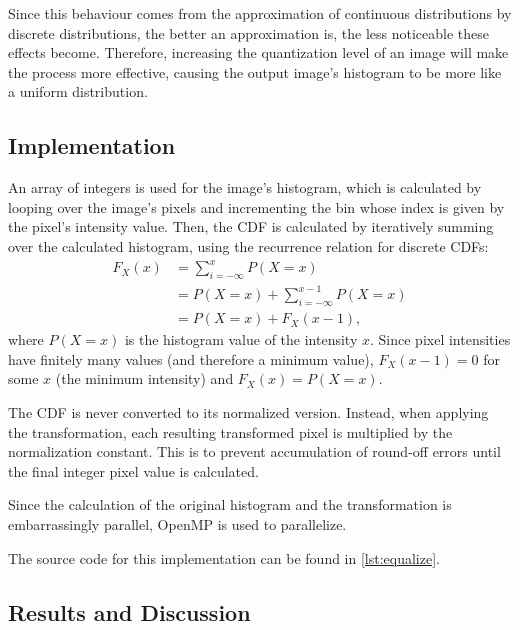 \documentclass[headings=optiontoheadandtoc,listof=totoc,parskip=full]{scrartcl}
\begin{document}
Since this behaviour comes from the approximation of continuous distributions by discrete distributions, the better an approximation is, the less noticeable these effects become. Therefore, increasing the quantization level of an image will make the process more effective, causing the output image's histogram to be more like a uniform distribution.

\subsection{Implementation}
\label{sec:equalization-implementation}

An array of integers is used for the image's histogram, which is calculated by looping over the image's pixels and incrementing the bin whose index is given by the pixel's intensity value. Then, the CDF is calculated by iteratively summing over the calculated histogram, using the recurrence relation for discrete CDFs:
\begin{equation}
	\begin{aligned}
		F_X(x) &= \sum_{i = -\infty}^x P(X = x)\\
			&= P(X = x) + \sum_{i = -\infty}^{x - 1} P(X = x)\\
			&= P(X = x) + F_X(x - 1),
	\end{aligned}
\end{equation}
where $P(X = x)$ is the histogram value of the intensity $x$. Since pixel intensities have finitely many values (and therefore a minimum value), $F_X(x - 1) = 0$ for some $x$ (the minimum intensity) and $F_X(x) = P(X = x)$.

The CDF is never converted to its normalized version. Instead, when applying the transformation, each resulting transformed pixel is multiplied by the normalization constant. This is to prevent accumulation of round-off errors until the final integer pixel value is calculated. \par

Since the calculation of the original histogram and the transformation is embarrassingly parallel, OpenMP is used to parallelize. \par

The source code for this implementation can be found in \cref{lst:equalize}.

\subsection{Results and Discussion}
\label{sec:equalization-results}
\end{document}
